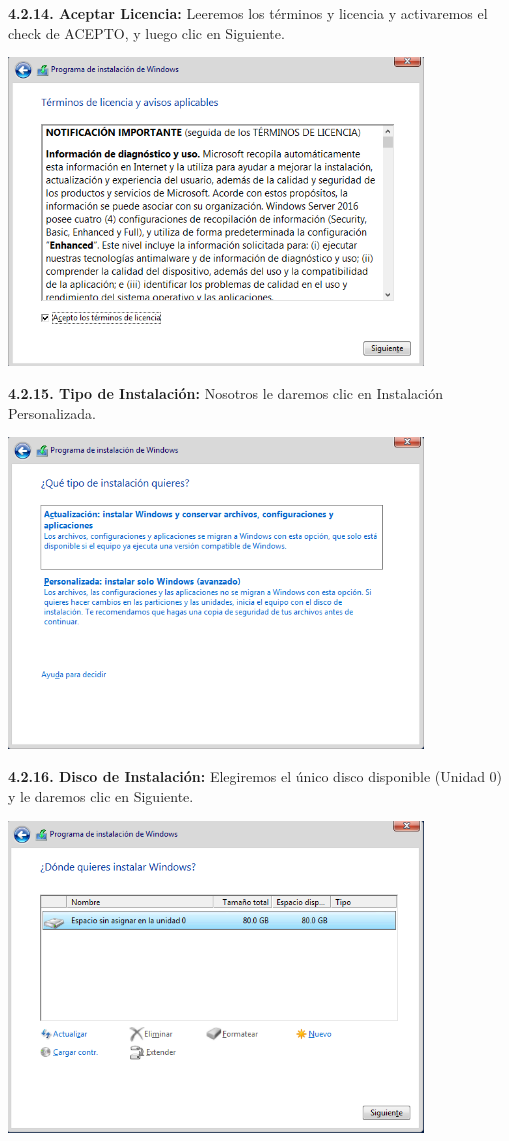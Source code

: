 \textbf {4.2.14. Aceptar Licencia:} Leeremos los términos y licencia y activaremos el check de ACEPTO, y luego clic en Siguiente.
\begin{center}
  \includegraphics[width=11cm]{Imagenes/Aceptar_Licencia.png}
\end{center}
\break

\textbf {4.2.15. Tipo de Instalación:} Nosotros le daremos clic en Instalación Personalizada.
\begin{center}
  \includegraphics[width=11cm]{Imagenes/Elegir_Tipo_Instalacion.png}
\end{center}

\textbf {4.2.16. Disco de Instalación:} Elegiremos el único disco disponible (Unidad 0) y le daremos clic en Siguiente.
\begin{center}
  \includegraphics[width=11cm]{Imagenes/Elegir_Disco_Instalacion.png}
\end{center}
\break

